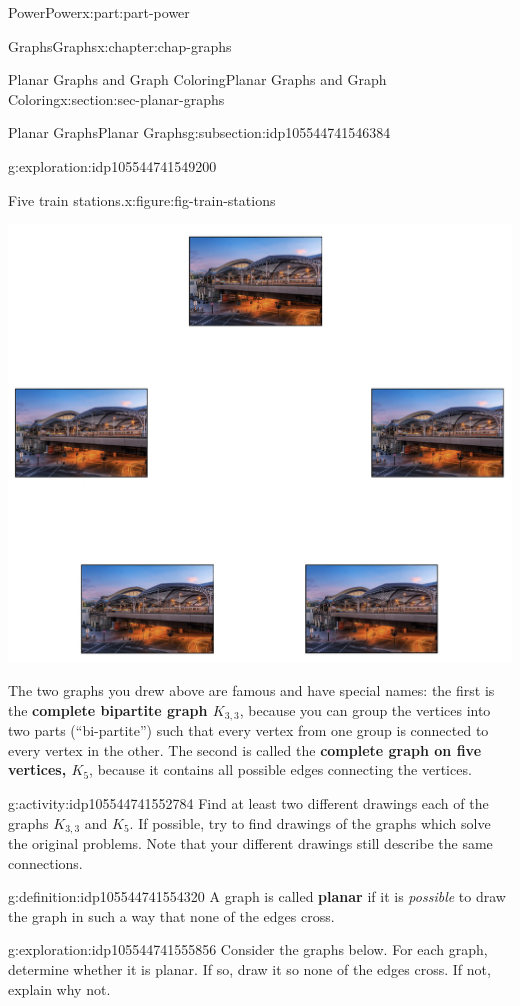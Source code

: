 \documentclass[oneside,10pt,]{book}
\newcommand{\terminology}[1]{\textbf{#1}}
\numberwithin{equation}{section}
\begin{document}
\begin{partptx}{Power}{}{Power}{}{}{x:part:part-power}
\begin{chapterptx}{Graphs}{}{Graphs}{}{}{x:chapter:chap-graphs}
\begin{sectionptx}{Planar Graphs and Graph Coloring}{}{Planar Graphs and Graph Coloring}{}{}{x:section:sec-planar-graphs}
\begin{subsectionptx}{Planar Graphs}{}{Planar Graphs}{}{}{g:subsection:idp105544741546384}
\begin{exploration}{}{g:exploration:idp105544741549200}
\begin{figureptx}{Five train stations.}{x:figure:fig-train-stations}{}
\begin{image}{0.25}{0.5}{0.25}%
\includegraphics[width=\linewidth]{./images/train-station.png}
\end{image}%
\tcblower
\end{figureptx}%
\end{exploration}%
The two graphs you drew above are famous and have special names: the first is the \terminology{complete bipartite graph \(K_{3,3}\)}, because you can group the vertices into two parts (``bi-partite'') such that every vertex from one group is connected to every vertex in the other. The second is called the \terminology{complete graph on five vertices, \(K_5\)}, because it contains all possible edges connecting the vertices.%
\begin{activity}{}{g:activity:idp105544741552784}%
Find at least two different drawings each of the graphs \(K_{3,3}\) and \(K_5\). If possible, try to find drawings of the graphs which solve the original problems. Note that your different drawings still describe the same connections.%
\end{activity}%
\begin{definition}{}{g:definition:idp105544741554320}%
%
A graph is called \terminology{planar} if it is \emph{possible} to draw the graph in such a way that none of the edges cross.%
\end{definition}
\begin{exploration}{}{g:exploration:idp105544741555856}%
Consider the graphs below. For each graph, determine whether it is planar. If so, draw it so none of the edges cross. If not, explain why not.%

\end{exploration}
\end{subsectionptx}
\end{sectionptx}
\end{chapterptx}
\end{partptx}
\end{document}
